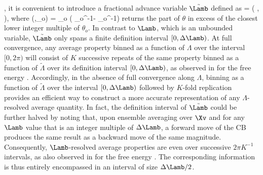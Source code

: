 , it is convenient to introduce a fractional advance variable $\tilde{\Lamb}$
defined as
%
   \tilde{\Lamb} = \gamma( \Lamb, \Delta \Lamb ),
\eeq
%
where
%
   \gamma(\theta,\theta_o)
     = \theta_o  \left( \theta_o^{-1}\theta - \lfloor \theta_o^{-1}\theta \rfloor \right)
\eeq
%
returns the part of $\theta$ in excess of the closest lower integer multiple of $\theta_o$.
%
In contrast to $\Lamb$, which is an unbounded variable, $\tilde{\Lamb}$ only spans a finite definition interval $[0,\Delta \Lamb)$.
%
At full convergence, 
any average property binned as a function 
of $\Lambda$ over the interval $[0,2\pi)$ will 
consist of $K$ successive repeats of the same property binned
as a function of $\tilde{\Lambda}$ over its definition interval $[0,\Delta \Lamb)$, as observed in  for the free energy .
%
Accordingly, in the absence of full convergence
along $\Lambda$, binning as a function of $\tilde{\Lambda}$
over the interval $[0,\Delta \Lamb)$ followed by $K$-fold replication
provides an efficient way to construct a more accurate representation of any 
$\Lambda$-resolved average quantity. In fact, the definition interval of $\tilde{\Lamb}$ could be further halved by noting that, upon ensemble averaging over $\Xv$ and for any $\Lamb$ value that is an integer multiple of $\Delta \Lamb$, a forward move of the CB produces the same result as a backward move of the same magnitude. Consequently, $\Lamb$-resolved average properties are even over successive $2\pi K^{-1}$ intervals, as also observed in  for the free energy
. The corresponding information is thus entirely encompassed in an interval of size $\Delta \Lamb /2$.

